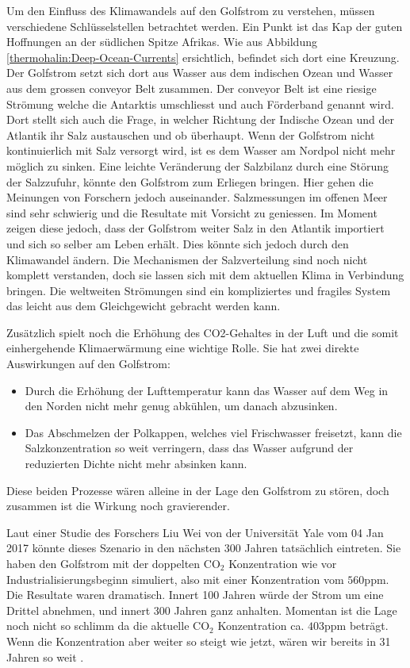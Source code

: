 Um den Einfluss des Klimawandels auf den Golfstrom zu verstehen, müssen verschiedene Schlüsselstellen betrachtet werden.
Ein Punkt ist das Kap der guten Hoffnungen an der südlichen Spitze Afrikas.
Wie aus Abbildung \ref{thermohalin:Deep-Ocean-Currents} ersichtlich, befindet sich dort eine Kreuzung.
Der Golfstrom setzt sich dort aus Wasser aus dem indischen Ozean und Wasser aus dem grossen conveyor Belt zusammen. Der conveyor Belt ist eine riesige Strömung welche die Antarktis umschliesst und auch Förderband genannt wird.
Dort stellt sich auch die Frage, in welcher Richtung der Indische Ozean und der Atlantik ihr Salz austauschen und ob überhaupt. Wenn der Golfstrom nicht kontinuierlich mit Salz versorgt wird, ist es dem Wasser am Nordpol nicht mehr möglich zu sinken. Eine leichte Veränderung der Salzbilanz durch eine Störung der Salzzufuhr, könnte den Golfstrom zum Erliegen bringen. Hier gehen die Meinungen von Forschern jedoch auseinander. Salzmessungen im offenen Meer sind sehr schwierig und die Resultate mit Vorsicht zu geniessen.
Im Moment zeigen diese jedoch, dass der Golfstrom weiter Salz in den Atlantik importiert und sich so selber am Leben erhält. Dies könnte sich jedoch durch den Klimawandel ändern. Die Mechanismen der Salzverteilung sind noch nicht komplett verstanden, doch sie lassen sich mit dem aktuellen Klima in Verbindung bringen. Die weltweiten Strömungen sind ein kompliziertes und fragiles System das leicht aus dem Gleichgewicht gebracht werden kann. 

Zusätzlich spielt noch die Erhöhung des CO2-Gehaltes in der Luft und die somit einhergehende Klimaerwärmung eine wichtige Rolle. Sie hat zwei direkte Auswirkungen auf den Golfstrom:

\begin{itemize}
	\item Durch die Erhöhung der Lufttemperatur kann das Wasser auf dem Weg in den Norden nicht mehr genug abkühlen, um danach abzusinken.
	\item Das Abschmelzen der Polkappen, welches viel Frischwasser freisetzt, kann die Salzkonzentration so weit verringern, dass das Wasser aufgrund der reduzierten Dichte nicht mehr absinken kann.
\end{itemize}

Diese beiden Prozesse wären alleine in der Lage den Golfstrom zu stören, doch zusammen ist die Wirkung noch gravierender.

Laut einer Studie des Forschers Liu Wei von der Universität Yale vom 04 Jan 2017 \cite{thermohalin:liuwei} könnte dieses Szenario in den nächsten 300 Jahren tatsächlich eintreten. Sie haben den Golfstrom mit der doppelten $\text{CO}_2$ Konzentration wie vor Industrialisierungsbeginn simuliert, also mit einer Konzentration vom $560\text{ppm}$. Die Resultate waren dramatisch. Innert 100 Jahren würde der Strom um eine Drittel abnehmen, und innert 300 Jahren ganz anhalten. Momentan ist die Lage noch nicht so schlimm da die aktuelle $\text{CO}_2$ Konzentration ca. $403\text{ppm}$\cite{thermohalin:co2} beträgt. Wenn die Konzentration aber weiter so steigt wie jetzt, wären wir bereits in 31 Jahren so weit .

